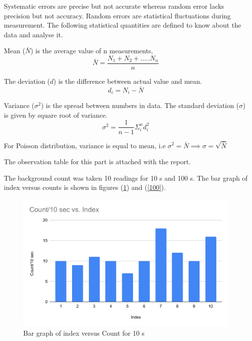 \documentclass[a4paper, amsfonts, amssymb, amsmath, reprint, showkeys, nofootinbib, twoside]{revtex4-1}
\begin{document}
Systematic errors are precise but not accurate whereas random error lacks precision but not accuracy. Random errors are statistical fluctuations during measurement. The following statistical quantities are defined to know about the data and analyse it.

Mean ($\bar{N}$) is the average value of n measurements,
\begin{equation}
	\bar{N}=\frac{N_1+N_2+.....N_n}{n}
\end{equation}

The deviation ($d$) is the difference between actual value and mean.
\begin{equation}
	d_i=N_i-\bar{N}
\end{equation}

Variance ($\sigma^2$) is the spread between numbers in data. The standard deviation ($\sigma$) is given by square root of variance. 
\begin{equation}
	\sigma^2=\frac{1}{n-1}\Sigma_i^n d_i^2
\end{equation}

For Poisson distribution, variance is equal to mean, i.e $\sigma^2=\bar{N}\implies \sigma =\sqrt{\bar{N}}$

The observation table for this part is attached with the report.

The background count was taken 10 readings for 10 s and 100 s. The bar graph of index versus counts is shown in figures (\ref{10}) and (\ref{100}).

\begin{figure}[H]
	\centering
	\includegraphics[scale=0.4]{10} 
	\caption{Bar graph of index versus Count for 10 s}
	\label{10}
\end{figure}
\end{document}
